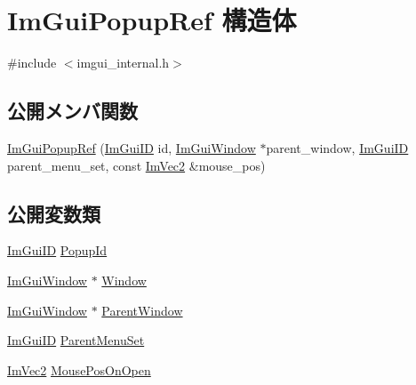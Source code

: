 \hypertarget{struct_im_gui_popup_ref}{}\section{Im\+Gui\+Popup\+Ref 構造体}
\label{struct_im_gui_popup_ref}


{\ttfamily \#include $<$imgui\+\_\+internal.\+h$>$}

\subsection*{公開メンバ関数}
\begin{DoxyCompactItemize}
\item 
\mbox{\hyperlink{struct_im_gui_popup_ref_af95848b705864b36b803745cd7b59250}{Im\+Gui\+Popup\+Ref}} (\mbox{\hyperlink{imgui_8h_a1785c9b6f4e16406764a85f32582236f}{Im\+Gui\+ID}} id, \mbox{\hyperlink{struct_im_gui_window}{Im\+Gui\+Window}} $\ast$parent\+\_\+window, \mbox{\hyperlink{imgui_8h_a1785c9b6f4e16406764a85f32582236f}{Im\+Gui\+ID}} parent\+\_\+menu\+\_\+set, const \mbox{\hyperlink{struct_im_vec2}{Im\+Vec2}} \&mouse\+\_\+pos)
\end{DoxyCompactItemize}
\subsection*{公開変数類}
\begin{DoxyCompactItemize}
\item 
\mbox{\hyperlink{imgui_8h_a1785c9b6f4e16406764a85f32582236f}{Im\+Gui\+ID}} \mbox{\hyperlink{struct_im_gui_popup_ref_a7037780575e28439414d28625a495bad}{Popup\+Id}}
\item 
\mbox{\hyperlink{struct_im_gui_window}{Im\+Gui\+Window}} $\ast$ \mbox{\hyperlink{struct_im_gui_popup_ref_a471027209038d1d59280a84c8d236f34}{Window}}
\item 
\mbox{\hyperlink{struct_im_gui_window}{Im\+Gui\+Window}} $\ast$ \mbox{\hyperlink{struct_im_gui_popup_ref_a7925cc312e5632661e0e6a2195af21b2}{Parent\+Window}}
\item 
\mbox{\hyperlink{imgui_8h_a1785c9b6f4e16406764a85f32582236f}{Im\+Gui\+ID}} \mbox{\hyperlink{struct_im_gui_popup_ref_afc2fc749bf54a0e3bab8defefe4a0a2b}{Parent\+Menu\+Set}}
\item 
\mbox{\hyperlink{struct_im_vec2}{Im\+Vec2}} \mbox{\hyperlink{struct_im_gui_popup_ref_ae7640a4130be4ba7518aee17c500d366}{Mouse\+Pos\+On\+Open}}
\end{DoxyCompactItemize}



